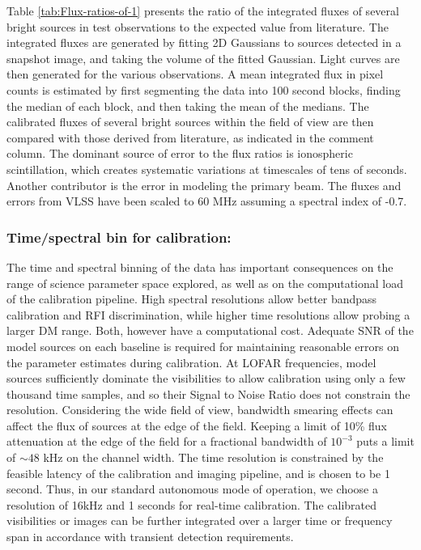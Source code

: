 \documentclass{aa}
\begin{document}
Table \ref{tab:Flux-ratios-of-1} presents the  ratio of the integrated fluxes of
several  bright  sources  in  test  observations  to  the  expected  value  from
literature.   The integrated  fluxes are  generated by  fitting 2D  Gaussians to
sources  detected in  a snapshot  image,  and taking  the volume  of the  fitted
Gaussian. Light curves  are then generated for the  various observations. A mean
integrated flux in  pixel counts is estimated by first  segmenting the data into
100 second blocks, finding the median of each block, and then taking the mean of
the medians.  The  calibrated fluxes of several bright  sources within the field
of view  are then compared with  those derived from literature,  as indicated in
the  comment  column.  The  dominant  source  of error  to  the  flux ratios  is
ionospheric scintillation, which creates  systematic variations at timescales of
tens  of seconds.   Another contributor  is the  error in  modeling  the primary
beam. The  fluxes and errors  from VLSS  have been scaled  to 60 MHz  assuming a
spectral index of -0.7.


\subsubsection{Time/spectral bin for calibration:} 
The time  and spectral  binning of  the data has  important consequences  on the
range of science parameter space explored,  as well as on the computational load
of the  calibration pipeline.  High  spectral resolutions allow  better bandpass
calibration and RFI discrimination,  while higher time resolutions allow probing
a larger DM range.  Both, however have a computational cost. Adequate SNR of the
model sources on each baseline  is required for maintaining reasonable errors on
the parameter estimates during calibration.  At LOFAR frequencies, model sources
sufficiently dominate  the visibilities  to allow calibration  using only  a few
thousand time samples, and so their Signal to Noise Ratio does not constrain the
resolution.  Considering the wide field  of view, bandwidth smearing effects can
affect the  flux of sources at  the edge of the  field. Keeping a  limit of 10\%
flux  attenuation  at the  edge  of  the field  for  a  fractional bandwidth  of
$10^{-3}$  puts  a  limit of  $\sim48$  kHz  on  the  channel width.   The  time
resolution is constrained by the feasible latency of the calibration and imaging
pipeline, and is  chosen to be 1 second.  Thus, in  our standard autonomous mode
of  operation, we  choose a  resolution  of 16kHz  and 1  seconds for  real-time
calibration.  The calibrated visibilities  or images  can be  further integrated
over  a larger time  or frequency  span in  accordance with  transient detection
requirements.
\end{document}
